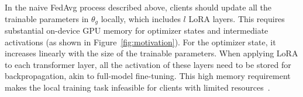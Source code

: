 \documentclass[lettersize,journal]{IEEEtran}
\newcommand{\hu}[1]{\stepcounter{todocounter}
  {\color{blue!90} #1}}
\begin{document}




In the naive FedAvg process described above, clients should update all the trainable parameters in $\boldsymbol{\mathcal{\theta}}_g$ locally, which includes $l$ LoRA layers. This requires substantial on-device GPU memory for optimizer states and intermediate activations (as shown in Figure~\ref{fig:motivation}). For the optimizer state, it increases linearly with the size of the trainable parameters. When applying LoRA to each transformer layer, all the activation of these layers need to be stored for backpropagation, {akin} to full-model fine-tuning. 
This high memory requirement makes the local training task infeasible for clients with limited resources~\cite{zhang2023memoryadaptive}. 
\end{document}
